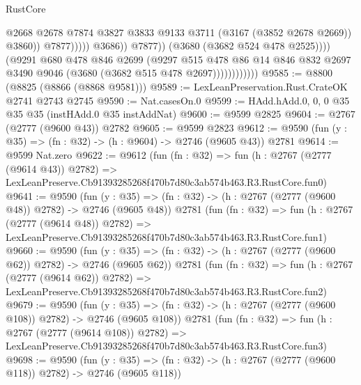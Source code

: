 \begin{lexlean}{RustCore}
\begin{coremodule}
                                              @2668
                                              @2678
                                              @7874
                                              @3827
                                              @3833
                                              @9133
                                              @3711
                                              (@3167 (@3852 @2678 @2669))
                                              @3860))
                                          @7877)))))
                                @3686))
                            @7877))
                        (@3680 (@3682 @524 @478 @2525))))
                    (@9291
                      @680
                      @478
                      @846
                      @2699
                      (@9297
                        @515
                        @478
                        @86
                        @14
                        @846
                        @832
                        @2697
                        @3490
                        @9046
                        (@3680 (@3682 @515 @478 @2697))))))))))))
@9585 := @8800 (@8825 (@8866 (@8868 @9581)))
@9589 := LexLeanPreservation.Rust.CrateOK @2741 @2743 @2745
@9590 := Nat.casesOn.{0}
@9599 := HAdd.hAdd.{0, 0, 0} @35 @35 @35 (instHAdd.{0} @35 instAddNat)
@9600 := @9599 @2825
@9604 := @2767 (@2777 (@9600 @43)) @2782
@9605 := @9599 @2823
@9612 := @9590 (fun (y : @35) => (fn : @32) -> (h : @9604) -> @2746 (@9605 @43)) @2781
@9614 := @9599 Nat.zero
@9622 := @9612
    (fun (fn : @32) =>
    fun (h : @2767 (@2777 (@9614 @43)) @2782) =>
    LexLeanPreserve.Cb91393285268f470b7d80c3ab574b463.R3.RustCore.fun0)
@9641 := @9590
    (fun (y : @35) => (fn : @32) -> (h : @2767 (@2777 (@9600 @48)) @2782) -> @2746 (@9605 @48))
    @2781
    (fun (fn : @32) =>
    fun (h : @2767 (@2777 (@9614 @48)) @2782) =>
    LexLeanPreserve.Cb91393285268f470b7d80c3ab574b463.R3.RustCore.fun1)
@9660 := @9590
    (fun (y : @35) => (fn : @32) -> (h : @2767 (@2777 (@9600 @62)) @2782) -> @2746 (@9605 @62))
    @2781
    (fun (fn : @32) =>
    fun (h : @2767 (@2777 (@9614 @62)) @2782) =>
    LexLeanPreserve.Cb91393285268f470b7d80c3ab574b463.R3.RustCore.fun2)
@9679 := @9590
    (fun (y : @35) => (fn : @32) -> (h : @2767 (@2777 (@9600 @108)) @2782) -> @2746 (@9605 @108))
    @2781
    (fun (fn : @32) =>
    fun (h : @2767 (@2777 (@9614 @108)) @2782) =>
    LexLeanPreserve.Cb91393285268f470b7d80c3ab574b463.R3.RustCore.fun3)
@9698 := @9590
    (fun (y : @35) => (fn : @32) -> (h : @2767 (@2777 (@9600 @118)) @2782) -> @2746 (@9605 @118))

\end{coremodule}
\end{lexlean}
